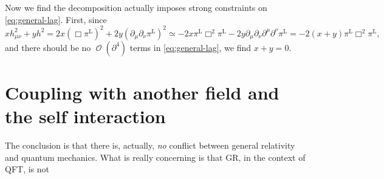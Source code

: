 \documentclass[hyperref, a4paper]{article}
\DeclareMathOperator{\bigO}{\mathcal{O}}
\begin{document}
Now we find the decomposition actually imposes strong constraints on \eqref{eq:general-lag}. First, 
since 
\[
    x h_{\mu \nu}^2 + y h^2 = 2 x (\Box \pi^\text{L})^2 + 2 y (\partial_\mu \partial_\nu \pi^\text{L})^2 \simeq 
    - 2x \pi^\text{L} \Box^2 \pi^\text{L} - 2y \partial_\mu \partial_\nu \partial^\mu \partial^\nu \pi^\text{L} 
    = - 2 (x+y) \pi^\text{L} \Box^2 \pi^\text{L},
\]
and there should be no $\bigO(\partial^4)$ terms in \eqref{eq:general-lag}, we find $x + y = 0$. 

\section{Coupling with another field and the self interaction}

The conclusion is that there is, actually, \emph{no} conflict between general relativity and quantum mechanics.
What is really concerning is that GR, in the context of QFT, is not 
\end{document}
